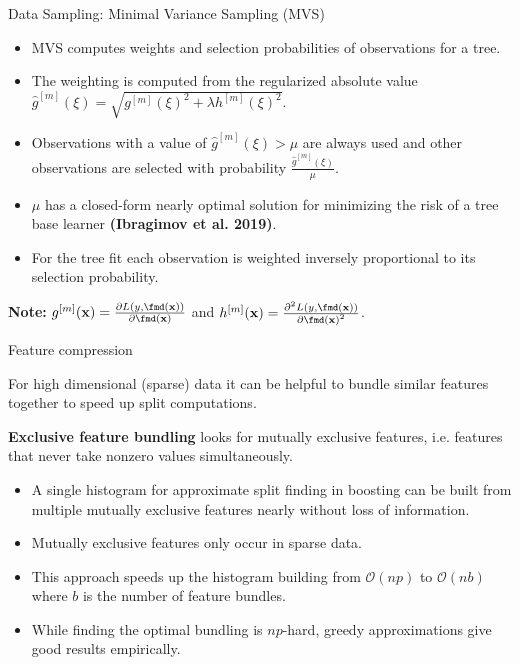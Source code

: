 \documentclass[11pt,compress,t,notes=noshow, xcolor=table]{beamer}
\begin{document}
\begin{vbframe}{Data Sampling: Minimal Variance Sampling (MVS)}


\begin{itemize}
  \item MVS computes weights and selection probabilities of observations for a tree.
  \item The weighting is computed from the regularized absolute value $\hat{g}^{[m]}(\xi)=\sqrt{g^{[m]}(\xi)^2 + \lambda h^{[m]}(\xi)^2}$.
  \item Observations with a value of $\hat{g}^{[m]}(\xi) > \mu$ are always used and other observations are selected with probability $\frac{\hat{g}^{[m]}(\xi)}{\mu}$.
  \item $\mu$ has a closed-form nearly optimal solution for minimizing the risk of a tree base learner \textbf{(Ibragimov et al. 2019)}.
  \item For the tree fit each observation is weighted inversely proportional to its selection probability.
\end{itemize}

\lz

\textbf{Note:} $g^{[m]}(\xv) = \frac{\partial L(y, \fmd(\xv))}{\partial \fmd(\xv)}$ and $h^{[m]}(\xv) = \frac{\partial^2 L(y, \fmd(\xv))}{\partial {\fmd(\xv)}^2}$.

\end{vbframe}


\begin{vbframe}{Feature compression}

For high dimensional (sparse) data it can be helpful to bundle similar features together to speed up split computations.

\lz

\textbf{Exclusive feature bundling} looks for mutually exclusive features, i.e. features that never take nonzero values simultaneously.

\lz

\begin{itemize}
  \item A single histogram for approximate split finding in boosting can be built from multiple mutually exclusive features nearly without loss of information.
  \item Mutually exclusive features only occur in sparse data.
  \item This approach speeds up the histogram building from $\mathcal{O}(np)$ to $\mathcal{O}(nb)$ where $b$ is the number of feature bundles.
  \item While finding the optimal bundling is $np$-hard, greedy approximations give good results empirically.
\end{itemize}

\end{vbframe}
\end{document}
